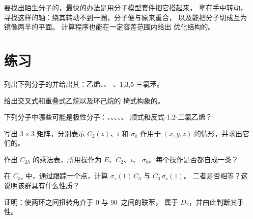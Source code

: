\begin{inthelab}[用分子模型套件研究对称性]
要找出陌生分子的，最快的办法是用分子模型套件把它搭起来，
拿在手中转动，寻找这样的轴：绕其转动不到一圈，分子便与原来重合，
以及能把分子切成互为镜像两半的平面。
计算程序也能在一定容差范围内给出
优化结构的。
\end{inthelab}

\section{练习}

\begin{exercise}[$\star$]\label{exo:b3:point-groups:1}
列出下列分子的并给出其：乙烯、、
、1,3,5-三氯苯。
\end{exercise}

\begin{exercise}[$\star$]\label{exo:b3:point-groups:2}
给出交叉式和重叠式乙烷以及环己烷的
椅式构象的。
\end{exercise}

\begin{exercise}[$\star$]\label{exo:b3:point-groups:3}
下列分子中哪些可能是极性分子：、、、、、
顺式和反式-1,2-二氯乙烯？
\end{exercise}

\begin{exercise}[$\star$]\label{exo:b3:point-groups:4}
写出 $3\times3$ 矩阵，分别表示 $C_2(z)$、$i$ 和 $\sigma_h$
作用于 $(x, y, z)$ 的情形，并求出它们的。
\end{exercise}

\begin{exercise}[$\star\star$]\label{exo:b3:point-groups:5}
作出 $C_{2h}$ 的乘法表，所用操作为 $E$、$C_2$、$i$、
$\sigma_h$。每个操作是否都自成一类？
\end{exercise}

\begin{exercise}[$\star\star$]\label{exo:b3:point-groups:6}
在 $C_{3v}$ 中，通过跟踪一个点，计算 $\sigma_v(1)\,C_3$ 与 $C_3\,\sigma_v(1)$。
二者是否相等？这说明该群具有什么性质？
\end{exercise}

\begin{exercise}[$\star\star$]\label{exo:b3:point-groups:7}
证明：使两环之间扭转角介于 0 与 90\textdegree\ 之间的联苯，
属于 $D_2$，并由此判断其手性。
\end{exercise}

